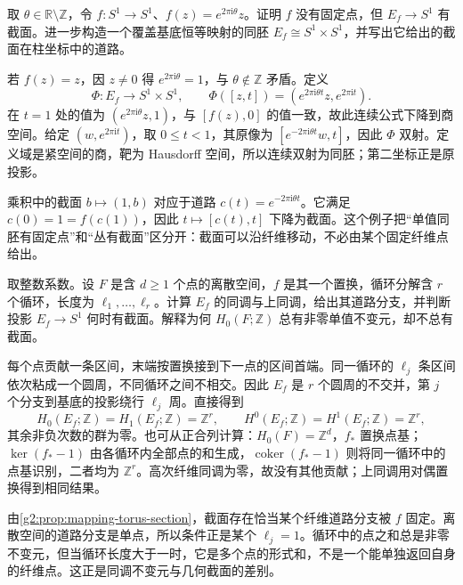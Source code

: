 \begin{exercise}\label{g2:ex:rotation-mapping-torus}
	取 \(\theta\in\mathbb R\setminus\mathbb Z\)，令 \(f:S^1\to S^1\)、\(f(z)=e^{2\pi\mathrm{i}\theta}z\)。证明 \(f\) 没有固定点，但 \(E_f\to S^1\) 有截面。进一步构造一个覆盖基底恒等映射的同胚 \(E_f\cong S^1\times S^1\)，并写出它给出的截面在柱坐标中的道路。
\end{exercise}
\begin{solution}
	若 \(f(z)=z\)，因 \(z\ne0\) 得 \(e^{2\pi\mathrm{i}\theta}=1\)，与 \(\theta\notin\mathbb Z\) 矛盾。定义
	\[
		\Phi:E_f\longrightarrow S^1\times S^1,
		\qquad \Phi([z,t])=(e^{2\pi\mathrm{i}\theta t}z,e^{2\pi\mathrm{i}t}).
	\]
	在 \(t=1\) 处的值为 \((e^{2\pi\mathrm{i}\theta}z,1)\)，与 \([f(z),0]\) 的值一致，故此连续公式下降到商空间。给定 \((w,e^{2\pi\mathrm{i}t})\)，取 \(0\leq t<1\)，其原像为 \([e^{-2\pi\mathrm{i}\theta t}w,t]\)，因此 \(\Phi\) 双射。定义域是紧空间的商，靶为 Hausdorff 空间，所以连续双射为同胚；第二坐标正是原投影。

	乘积中的截面 \(b\mapsto(1,b)\) 对应于道路 \(c(t)=e^{-2\pi\mathrm{i}\theta t}\)。它满足 \(c(0)=1=f(c(1))\)，因此 \(t\mapsto[c(t),t]\) 下降为截面。这个例子把“单值同胚有固定点”和“丛有截面”区分开：截面可以沿纤维移动，不必由某个固定纤维点给出。
\end{solution}

\begin{exercise}\label{g2:ex:permutation-mapping-torus}
	取整数系数。设 \(F\) 是含 \(d\geq1\) 个点的离散空间，\(f\) 是其一个置换，循环分解含 \(r\) 个循环，长度为 \(\ell_1,\ldots,\ell_r\)。计算 \(E_f\) 的同调与上同调，给出其道路分支，并判断投影 \(E_f\to S^1\) 何时有截面。解释为何 \(H_0(F;\mathbb Z)\) 总有非零单值不变元，却不总有截面。
\end{exercise}
\begin{solution}
	每个点贡献一条区间，末端按置换接到下一点的区间首端。同一循环的 \(\ell_j\) 条区间依次粘成一个圆周，不同循环之间不相交。因此 \(E_f\) 是 \(r\) 个圆周的不交并，第 \(j\) 个分支到基底的投影绕行 \(\ell_j\) 周。直接得到
	\[
		H_0(E_f;\mathbb Z)=H_1(E_f;\mathbb Z)=\mathbb Z^r,
		\qquad H^0(E_f;\mathbb Z)=H^1(E_f;\mathbb Z)=\mathbb Z^r,
	\]
	其余非负次数的群为零。也可从正合列计算：\(H_0(F)=\mathbb Z^d\)，\(f_*\) 置换点基；\(\ker(f_*-1)\) 由各循环内全部点的和生成，\(\operatorname{coker}(f_*-1)\) 则将同一循环中的点基识别，二者均为 \(\mathbb Z^r\)。高次纤维同调为零，故没有其他贡献；上同调用对偶置换得到相同结果。

	由\cref{g2:prop:mapping-torus-section}，截面存在恰当某个纤维道路分支被 \(f\) 固定。离散空间的道路分支是单点，所以条件正是某个 \(\ell_j=1\)。循环中的点之和总是非零不变元，但当循环长度大于一时，它是多个点的形式和，不是一个能单独返回自身的纤维点。这正是同调不变元与几何截面的差别。
\end{solution}
